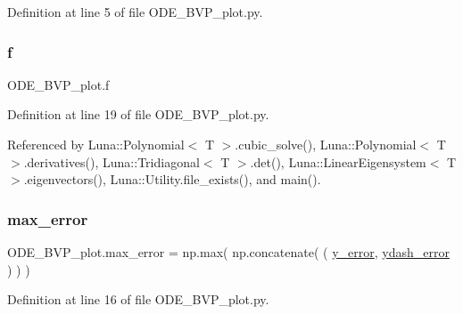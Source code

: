 Definition at line 5 of file O\+D\+E\+\_\+\+B\+V\+P\+\_\+plot.\+py.

\mbox{\label{namespaceODE__BVP__plot_a950605ac9efe3d57c5d08a1d684f357b}} 
\subsubsection{\texorpdfstring{f}{f}}
{\footnotesize\ttfamily O\+D\+E\+\_\+\+B\+V\+P\+\_\+plot.\+f}



Definition at line 19 of file O\+D\+E\+\_\+\+B\+V\+P\+\_\+plot.\+py.



Referenced by Luna\+::\+Polynomial$<$ T $>$.\+cubic\+\_\+solve(), Luna\+::\+Polynomial$<$ T $>$.\+derivatives(), Luna\+::\+Tridiagonal$<$ T $>$.\+det(), Luna\+::\+Linear\+Eigensystem$<$ T $>$.\+eigenvectors(), Luna\+::\+Utility.\+file\+\_\+exists(), and main().

\mbox{\label{namespaceODE__BVP__plot_af98eda3ba188f29a21f5f2f124a2e88a}} 
\subsubsection{\texorpdfstring{max\+\_\+error}{max\_error}}
{\footnotesize\ttfamily O\+D\+E\+\_\+\+B\+V\+P\+\_\+plot.\+max\+\_\+error = np.\+max( np.\+concatenate( ( \hyperlink{namespaceODE__BVP__plot_a8db68424e12aa3dfa6fd2c118cba6e7c}{y\+\_\+error}, \hyperlink{namespaceODE__BVP__plot_a32b60056578e16000892cd7c6286aa07}{ydash\+\_\+error} ) ) )}



Definition at line 16 of file O\+D\+E\+\_\+\+B\+V\+P\+\_\+plot.\+py.

\mbox{\label{namespaceODE__BVP__plot_aa6f0b58debc64720190d4915f760aa5a}} 
